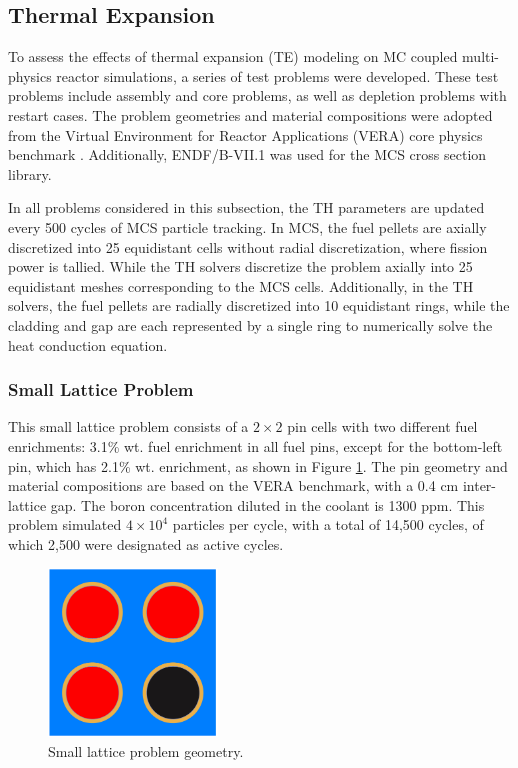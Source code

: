 \subsection{Thermal Expansion} \label{sec42}

To assess the effects of thermal expansion (TE) modeling on MC coupled multi-physics reactor simulations, a series of test problems were developed. These test problems include assembly and core problems, as well as depletion problems with restart cases. The problem geometries and material compositions were adopted from the Virtual Environment for Reactor Applications (VERA) core physics benchmark \cite{godfrey}. Additionally, ENDF/B-VII.1 was used for the MCS cross section library.

In all problems considered in this subsection, the TH parameters are updated every 500 cycles of MCS particle tracking. In MCS, the fuel pellets are axially discretized into 25 equidistant cells without radial discretization, where fission power is tallied. While the TH solvers discretize the problem axially into 25 equidistant meshes corresponding to the MCS cells. Additionally, in the TH solvers, the fuel pellets are radially discretized into 10 equidistant rings, while the cladding and gap are each represented by a single ring to numerically solve the heat conduction equation.


\subsubsection{Small Lattice Problem}

This small lattice problem consists of a $2\times2$ pin cells with two different fuel enrichments: 3.1\% wt. fuel enrichment in all fuel pins, except for the bottom-left pin, which has 2.1\% wt. enrichment, as shown in Figure \ref{fig_42a}. The pin geometry and material compositions are based on the VERA benchmark, with a 0.4 cm inter-lattice gap. The boron concentration diluted in the coolant is 1300 ppm. This problem simulated $4\times10^4$ particles per cycle, with a total of 14,500 cycles, of which 2,500 were designated as active cycles.

\begin{figure}[h]
    \centering
    \includegraphics[width=0.4\textwidth]{figs/xy_plot_noGrid.pdf}
    \caption{Small lattice problem geometry.}
    \label{fig_42a}
\end{figure}

